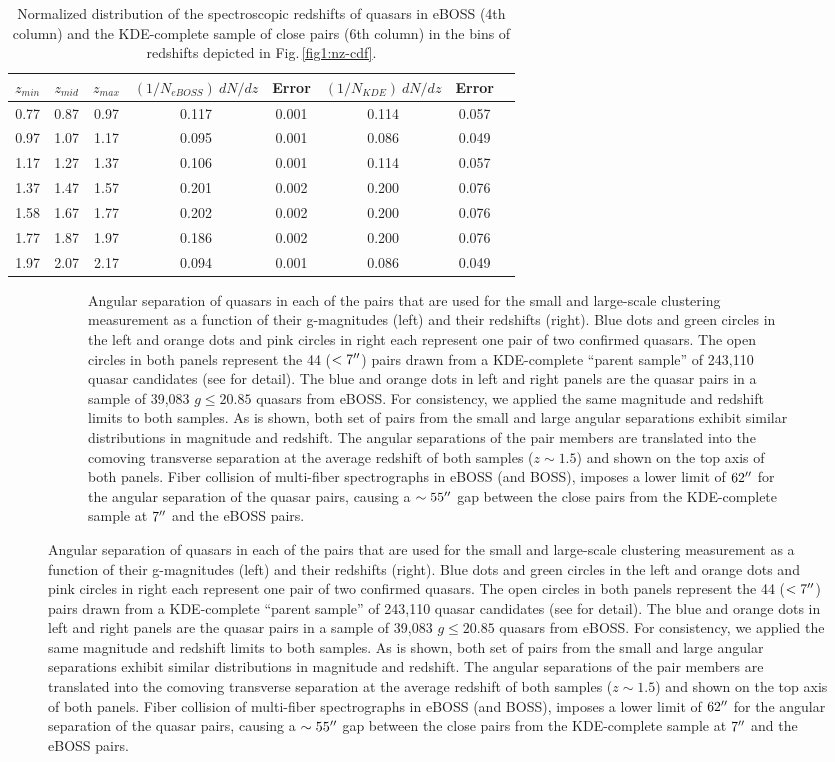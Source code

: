\documentclass[useAMS,usenatbib]{mn2e}
\begin{document}
\begin{table}
\centering
\begin{tabular}{cccccccc}

\hline
\hline
$z_{min}$   &$z_{mid}$ &$z_{max}$& $(1/N_{eBOSS})~dN/dz$ & Error & $(1/N_{KDE})~dN/dz$& Error\\

\hline


0.77 & 0.87 & 0.97 & 0.117 & 0.001 & 0.114 & 0.057 \\
0.97 & 1.07 & 1.17 & 0.095 & 0.001 & 0.086 & 0.049 \\
1.17 & 1.27 & 1.37 & 0.106 & 0.001 & 0.114 & 0.057 \\
1.37 & 1.47 & 1.57 & 0.201 & 0.002 & 0.200 & 0.076 \\
1.58 & 1.67 & 1.77 & 0.202 & 0.002 & 0.200 & 0.076 \\
1.77 & 1.87 & 1.97 & 0.186 & 0.002 & 0.200 & 0.076 \\
1.97 & 2.07 & 2.17 & 0.094 & 0.001 & 0.086 & 0.049 \\

\hline
\end{tabular}
\caption{ Normalized distribution of the spectroscopic redshifts of quasars in eBOSS (4th column) and the KDE-complete sample of close pairs (6th column) in the bins of redshifts depicted in Fig.\,\ref{fig1:nz-cdf}.}\label{tab:dndz}

\end{table}

\begin{figure}
    \centering
    \begin{subfigure}{
        \centering
        \texttt{[image: gmag\_R\_theta\_eBOSS\_KDE.eps]}
        \texttt{[image: z\_R\_theta\_eBOSS\_KDE.eps]}}
        \caption{Angular separation of quasars in each of the pairs that are 
used for the small and large-scale clustering measurement as a function of their 
g-magnitudes (left) and their redshifts (right). Blue dots and green circles in 
the left and orange dots and pink circles in right each represent one pair of 
two confirmed quasars. The open circles in both panels represent the 44 ($< 7 
\arcsec$) pairs drawn from a KDE-complete ``parent sample'' of  243{,}110 quasar 
candidates (see \citet{ef17} for detail). The blue and orange dots in left and 
right panels are the quasar pairs in a sample of 39{,}083 $g\le 20.85$ quasars 
from eBOSS. For consistency, we applied the same magnitude and redshift limits to both samples. 
As is shown, both set of pairs from the small and large angular separations 
exhibit similar distributions in magnitude and redshift. 
The angular separations of the pair members are translated into the 
comoving transverse separation at the average redshift of both samples ($z\sim 
1.5$) and shown on the top axis of both panels. Fiber collision of multi-fiber 
spectrographs in eBOSS (and BOSS), imposes a lower limit of $62\arcsec$ for the 
angular separation of the quasar pairs, causing a $\sim 55\arcsec$ gap between 
the close pairs from the KDE-complete sample at $7\arcsec$ and the eBOSS 
pairs.}\label{fig2:gz}
    \end{subfigure}
\end{figure}
\end{document}
